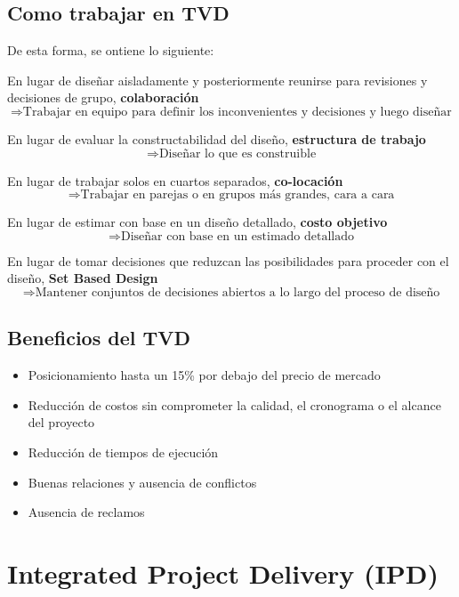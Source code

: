 \subsection{Como trabajar en TVD}

De esta forma, se ontiene lo siguiente:


\noindent En lugar de diseñar aisladamente y posteriormente reunirse para revisiones y decisiones de grupo, \textbf{colaboración} 
\[
\Rightarrow \text{Trabajar en equipo para definir los inconvenientes y decisiones y luego diseñar conforme a esas decisiones}
\]

\noindent En lugar de evaluar la constructabilidad del diseño, \textbf{estructura de trabajo}
\[
\Rightarrow \text{Diseñar lo que es construible}
\]

\noindent En lugar de trabajar solos en cuartos separados, \textbf{co-locación}
\[
\Rightarrow \text{Trabajar en parejas o en grupos más grandes, cara a cara}
\]

\noindent En lugar de estimar con base en un diseño detallado, \textbf{costo objetivo}
\[
\Rightarrow \text{Diseñar con base en un estimado detallado}
\]

\noindent En lugar de tomar decisiones que reduzcan las posibilidades para proceder con el diseño, \textbf{Set Based Design}
\[
\Rightarrow \text{Mantener conjuntos de decisiones abiertos a lo largo del proceso de diseño}
\]

\subsection{Beneficios del TVD}

\begin{itemize}
    \item Posicionamiento hasta un 15\% por debajo del precio de mercado
    \item Reducción de costos sin comprometer la calidad, el cronograma o el alcance del proyecto
    \item Reducción de tiempos de ejecución
    \item Buenas relaciones y ausencia de conflictos
    \item Ausencia de reclamos
\end{itemize}

\section{Integrated Project Delivery (IPD)}

